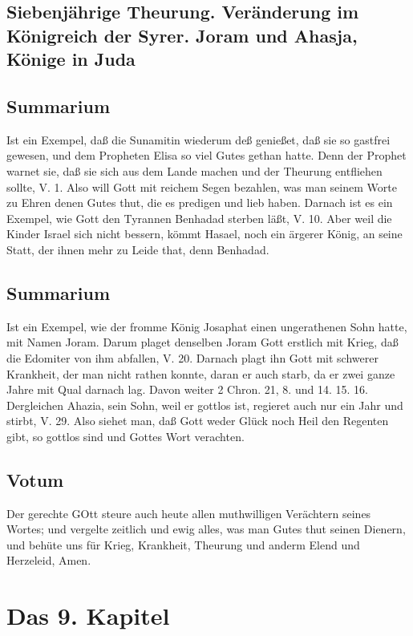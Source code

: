 \section[Siebenjährige Theurung. Veränderung im Königreich der Syrer. Joram]{Siebenjährige Theurung. Veränderung im Königreich der Syrer. Joram und Ahasja, Könige in Juda}

\section{Summarium}

Ist ein Exempel, daß die Sunamitin wiederum deß genießet, daß sie so gastfrei gewesen, und dem Propheten Elisa so viel Gutes gethan hatte. Denn der Prophet warnet sie, daß sie sich aus dem Lande machen und der Theurung entfliehen sollte, V. 1. Also will Gott mit reichem Segen bezahlen, was man seinem Worte zu Ehren denen Gutes thut, die es predigen und lieb haben. Darnach ist es ein Exempel, wie Gott den Tyrannen Benhadad sterben läßt, V. 10. Aber weil die Kinder Israel sich nicht bessern, kömmt Hasael, noch ein ärgerer König, an seine Statt, der ihnen mehr zu Leide that, denn Benhadad.

\section{Summarium}

Ist ein Exempel, wie der fromme König Josaphat einen ungerathenen Sohn hatte, mit Namen Joram. Darum plaget denselben Joram Gott erstlich mit Krieg, daß die Edomiter von ihm abfallen, V. 20. Darnach plagt ihn Gott mit schwerer Krankheit, der man nicht rathen konnte, daran er auch starb, da er zwei ganze Jahre mit Qual darnach lag. Davon weiter 2 Chron. 21, 8. und 14. 15. 16. Dergleichen Ahazia, sein Sohn, weil er gottlos ist, regieret auch nur ein Jahr und stirbt, V. 29. Also siehet man, daß Gott weder Glück noch Heil den Regenten gibt, so gottlos sind und Gottes Wort verachten.

\section{Votum}

Der gerechte GOtt steure auch heute allen muthwilligen Verächtern seines Wortes; und vergelte zeitlich und ewig alles, was man Gutes thut seinen Dienern, und behüte uns für Krieg, Krankheit, Theurung und anderm Elend und Herzeleid, Amen.

\chapter{Das 9. Kapitel}

